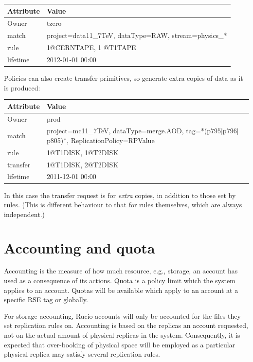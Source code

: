 \documentclass{atlasnote}
\begin{document}
\begin{tabular}{l p{6cm}}
  \textbf{Attribute} & \textbf{Value} \\\hline
  Owner & tzero \\\hline
  match & project=data11\_7TeV,  dataType=RAW, stream=physics\_* \\\hline
  rule & 1@CERNTAPE, 1 @T1TAPE \\\hline
  lifetime & 2012-01-01 00:00 \\\hline
\end{tabular}

\bigskip
 
Policies can also create transfer primitives, so generate extra copies
of data as it is produced:

\medskip

\begin{tabular}{l p{6cm}}
  \textbf{Attribute} & \textbf{Value} \\\hline
  Owner & prod \\\hline
  match & \sloppy project=mc11\_7TeV, dataType=merge.AOD,
  tag=*(p795$\mid$p796$\mid$p805)*, {ReplicationPolicy}=RPValue \\\hline
  rule & 1@T1DISK, 1@T2DISK \\\hline
  transfer & 1@T1DISK, 2@T2DISK \\\hline
  lifetime & 2011-12-01 00:00  \\\hline
\end{tabular}

\medskip
 
In this case the transfer request is for \emph{extra} copies, in
addition to those set by rules. (This is different behaviour to that
for rules themselves, which are always independent.)

\section{Accounting and quota}
\label{overview_Accounting_and_quota:accounting-and-quota}\label{overview_Accounting_and_quota::doc}
Accounting is the measure of how much resource, e.g., storage, an
account has used as a consequence of its actions. Quota is a policy
limit which the system applies to an account. Quotas will be available
which apply to an account at a specific RSE tag or globally.

For storage accounting, Rucio accounts will only be accounted for the
files they set replication rules on. Accounting is based on the
replicas an account requested, not on the actual amount of physical
replicas in the system. Consequently, it is expected that over-booking
of physical space will be employed as a particular physical replica
may satisfy several replication rules.
\end{document}
